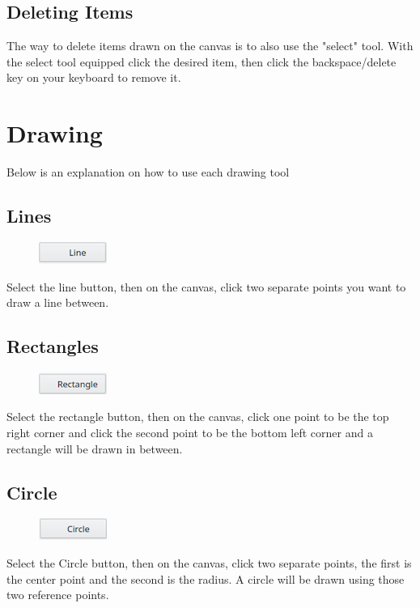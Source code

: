 \subsection{Deleting Items}
    The way to delete items drawn on the canvas is to also use the "select" tool. With the select tool equipped click the desired item, then click the backspace/delete key on your keyboard to remove it.

\section{Drawing}
Below is an explanation on how to use each drawing tool

\subsection{Lines}
\begin{figure}[h!]
\includegraphics{line}
\end{figure}
Select the line button, then on the canvas, click two separate points you want to draw a line between.

\subsection{Rectangles}
\begin{figure}[h!]
\includegraphics{rect}
\end{figure}
Select the rectangle button, then on the canvas, click one point to be the top right corner and click the second point to be the bottom left corner and a rectangle will be drawn in between.

\subsection{Circle}
\begin{figure}[h!]
\includegraphics{circle}
\end{figure}
Select the Circle button, then on the canvas, click two separate points, the first is the center point and the second is the radius. A circle will be drawn using those two reference points.

